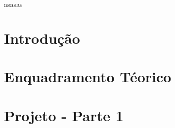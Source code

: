\documentclass[a4paper,twoside,11pt]{article}
\begin{document}
    

    asasas\cite{fcc-distributed-systems}

    \section{Introdução}\label{sec:introduction}
    

    \section{Enquadramento Téorico}\label{sec:theoretical_context}
    

    \section{Projeto - Parte 1}\label{sec:project_part1}
    

    
    
\end{document}
